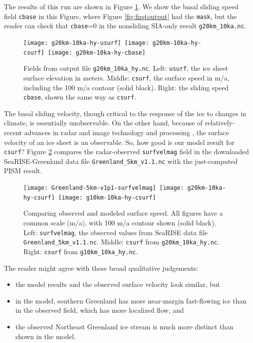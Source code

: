 The results of this run are shown in Figure \ref{fig:secondoutputcoarse}.  We show the basal sliding speed field \texttt{cbase} in this Figure, where Figure \ref{fig:firstoutput} had the \texttt{mask}, but the reader can check that \texttt{cbase}=0 in the nonsliding SIA-only result \texttt{g20km_10ka.nc}.

\begin{figure}[ht]
\centering
\mbox{\texttt{[image: g20km-10ka-hy-usurf]} \texttt{[image: g20km-10ka-hy-csurf]} \texttt{[image: g20km-10ka-hy-cbase]}}
\caption{Fields from output file \texttt{g20km_10ka_hy.nc}.  Left: \texttt{usurf}, the ice sheet surface elevation in meters.  Middle: \texttt{csurf}, the surface speed in m/a, including the 100 m/a contour (solid black).  Right: the sliding speed \texttt{cbase}, shown the same way as \texttt{csurf}.}
\label{fig:secondoutputcoarse}
\end{figure}

The basal sliding velocity, though critical to the response of the ice to changes in climate, is essentially unobservable.  On the other hand, because of relatively-recent advances in radar and image technology and processing \cite{Joughin2002}, the surface velocity of an ice sheet is an observable.  So, how good is our model result for \texttt{csurf}?  Figure \ref{fig:csurfvsobserved} compares the radar-observed \texttt{surfvelmag} field in the downloaded SeaRISE-Greenland data file \texttt{Greenland_5km_v1.1.nc} with the just-computed PISM result.

\begin{figure}[ht]
\centering
\mbox{\texttt{[image: Greenland-5km-v1p1-surfvelmag]} \texttt{[image: g20km-10ka-hy-csurf]} \texttt{[image: g10km-10ka-hy-csurf]}}
\caption{Comparing observed and modeled surface speed.  All figures have a common scale (m/a), with 100 m/a contour shown (solid black).  Left: \texttt{surfvelmag}, the observed values from SeaRISE data file \texttt{Greenland_5km_v1.1.nc}.  Middle: \texttt{csurf} from \texttt{g20km_10ka_hy.nc}.  Right: \texttt{csurf} from \texttt{g10km_10ka_hy.nc}.}
\label{fig:csurfvsobserved}
\end{figure}

The reader might agree with these broad qualitative judgements:
\begin{itemize}
\item the model results and the observed surface velocity look similar, but
\item in the model, southern Greenland has more near-margin fast-flowing ice than in the observed field, which has more localized flow, and
\item the observed Northeast Greenland ice stream is much more distinct than shown in the model.
\end{itemize}

